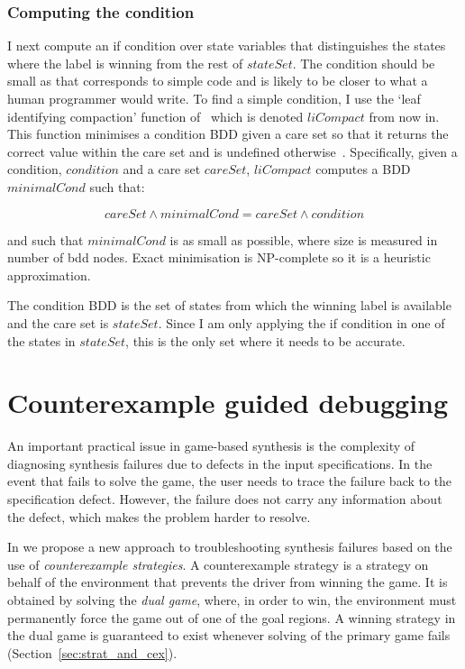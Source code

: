 \subsubsection{Computing the condition}

I next compute an if condition over state variables that distinguishes the states where the label is winning from the rest of $stateSet$. The condition should be small as that corresponds to simple code and is likely to be closer to what a human programmer would write. To find a simple condition, I use the `leaf identifying compaction' function of~\cite{Hong} which is denoted $liCompact$ from now in. This function minimises a condition BDD given a care set so that it returns the correct value within the care set and is undefined otherwise~\cite{Hong}. Specifically, given a condition, $condition$ and a care set $careSet$, $liCompact$ computes a BDD $minimalCond$ such that:

\begin{equation}
    careSet \land minimalCond = careSet \land condition
\end{equation}

\noindent and such that $minimalCond$ is as small as possible, where size is measured in number of bdd nodes. Exact minimisation is NP-complete so it is a heuristic approximation.

The condition BDD is the set of states from which the winning label is available and the care set is $stateSet$. Since I am only applying the if condition in one of the states in $stateSet$, this is the only set where it needs to be accurate. 

\section{Counterexample guided debugging}
\label{s:debug}

An important practical issue in game-based synthesis is the complexity of diagnosing synthesis failures due to defects in the input specifications.  In the event that \termite fails to solve the game, the user needs to trace the failure back to the specification defect.  However, the failure does not carry any information about the defect, which makes the problem harder to resolve.

In \termite we propose a new approach to troubleshooting synthesis failures based on the use of \emph{counterexample strategies}.  A counterexample strategy is a strategy on behalf of the environment that prevents the driver from winning the game.  It is obtained by solving the \emph{dual game}, where, in order to win, the environment must permanently force the game out of one of the goal regions.  A winning strategy in the dual game is guaranteed to exist whenever solving of the primary game fails (Section~\ref{sec:strat_and_cex}).

